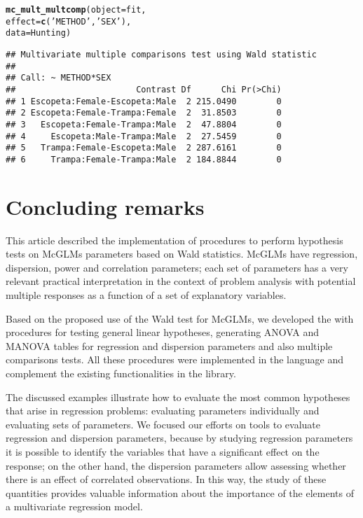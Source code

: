 \documentclass[article]{jss}\usepackage[]{graphicx}\usepackage[]{xcolor}
\makeatletter
\newcommand{\hlstr}[1]{\textcolor[rgb]{0.192,0.494,0.8}{#1}}%
\newcommand{\hlstd}[1]{\textcolor[rgb]{0.345,0.345,0.345}{#1}}%
\newcommand{\hlkwc}[1]{\textcolor[rgb]{0.333,0.667,0.333}{#1}}%
\newcommand{\hlkwd}[1]{\textcolor[rgb]{0.737,0.353,0.396}{\textbf{#1}}}%
\newenvironment{kframe}{%
 \def\at@end@of@kframe{}%
 \ifinner\ifhmode%
  \def\at@end@of@kframe{\end{minipage}}%
  \begin{minipage}{\columnwidth}%
 \fi\fi%
 \def\FrameCommand##1{\hskip\@totalleftmargin \hskip-\fboxsep
 \colorbox{shadecolor}{##1}\hskip-\fboxsep
     \hskip-\linewidth \hskip-\@totalleftmargin \hskip\columnwidth}%
 \MakeFramed {\advance\hsize-\width
   \@totalleftmargin\z@ \linewidth\hsize
   \@setminipage}}%
 {\par\unskip\endMakeFramed%
 \at@end@of@kframe}
\newenvironment{knitrout}{}{} %
\makeatother
\begin{document}
\begin{knitrout}
\color{fgcolor}\begin{kframe}
\begin{alltt}
\hlkwd{mc_mult_multcomp}\hlstd{(}\hlkwc{object} \hlstd{= fit,}
                 \hlkwc{effect} \hlstd{=} \hlkwd{c}\hlstd{(}\hlstr{'METHOD'}\hlstd{,} \hlstr{'SEX'}\hlstd{),}
                 \hlkwc{data} \hlstd{= Hunting)}
\end{alltt}
\begin{verbatim}
## Multivariate multiple comparisons test using Wald statistic
## 
## Call: ~ METHOD*SEX
##                        Contrast Df      Chi Pr(>Chi)
## 1 Escopeta:Female-Escopeta:Male  2 215.0490        0
## 2 Escopeta:Female-Trampa:Female  2  31.8503        0
## 3   Escopeta:Female-Trampa:Male  2  47.8804        0
## 4     Escopeta:Male-Trampa:Male  2  27.5459        0
## 5   Trampa:Female-Escopeta:Male  2 287.6161        0
## 6     Trampa:Female-Trampa:Male  2 184.8844        0
\end{verbatim}
\end{kframe}
\end{knitrout}


\section{Concluding remarks}\label{sec:conclusao}

This article described the  implementation of procedures to perform hypothesis tests on McGLMs parameters based on Wald statistics. McGLMs have regression, dispersion, power and correlation parameters; each set of parameters has a very relevant practical interpretation in the context of problem analysis with potential multiple responses as a function of a set of explanatory variables.

Based on the proposed use of the Wald test for McGLMs, we developed the  with procedures for testing general linear hypotheses, generating ANOVA and MANOVA tables for regression and dispersion parameters and also multiple comparisons tests. All these procedures were implemented in the  language and complement the existing functionalities in the  library.

The discussed examples illustrate how to evaluate the most common hypotheses that arise in regression problems: evaluating parameters individually and evaluating sets of parameters. We focused our efforts on tools to evaluate regression and dispersion parameters, because by studying regression parameters it is possible to identify the variables that have a significant effect on the response; on the other hand, the dispersion parameters allow assessing whether there is an effect of correlated observations. In this way, the study of these quantities provides valuable information about the importance of the elements of a multivariate regression model.
\end{document}
